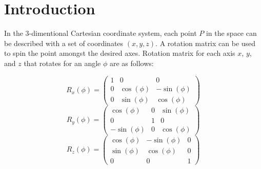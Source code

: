 \section{Introduction}
In the 3-dimentional Cartesian coordinate system, 
each point \(P\) in the space can be described with a set of coordinates \((x,y,z)\). 
A rotation matrix can be used to spin the point amongst the desired axes. 
Rotation matrix for each axis \(x\), \(y\), and \(z\) that rotates for an angle \(\phi\) are as follows:

\[
R_x (\phi)=
\begin{pmatrix}
        1 & 0 & 0 \\
        0 & \cos(\phi) & -\sin(\phi) \\
        0 & \sin(\phi) & \cos(\phi)
    \end{pmatrix}
\]
\[
R_y (\phi)=
    \begin{pmatrix}
        \cos(\phi) & 0 & \sin(\phi) \\
        0 & 1 & 0 \\
        -\sin(\phi) & 0 & \cos(\phi)
    \end{pmatrix}
\]
\[
R_z (\phi)=
    \begin{pmatrix}
        \cos(\phi) & -\sin(\phi) & 0 \\
        \sin(\phi) & \cos(\phi) & 0 \\
        0 & 0 & 1
    \end{pmatrix}
\]